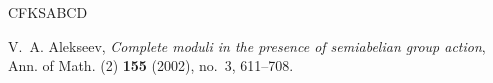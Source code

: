 \documentclass[10pt]{amsart}
\numberwithin{equation}{section}
\theoremstyle{remark}
\theoremstyle{definition}
\theoremstyle{definition}
\theoremstyle{definition}
\theoremstyle{definition}
\theoremstyle{definition}
\theoremstyle{definition}
\theoremstyle{definition}
\theoremstyle{definition}
\begin{document}
 
\begin{thebibliography}{CFKSABCD}
 
  V.~A. Alekseev, \textit{Complete moduli in the presence of semiabelian group action}, Ann. of Math. (2) {\bf 155} (2002), no.~3, 611--708.
%
% 
%    
% 
% 
% 
%
% 
%  
% 
% 
% 
%              


\end{thebibliography}
\end{document}
